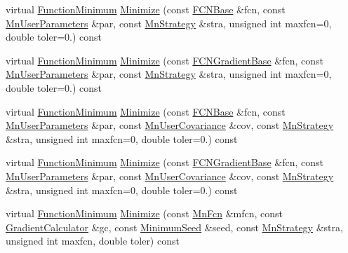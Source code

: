 \begin{DoxyCompactItemize}
\item 
virtual \mbox{\hyperlink{classROOT_1_1Minuit2_1_1FunctionMinimum}{Function\+Minimum}} \mbox{\hyperlink{classROOT_1_1Minuit2_1_1FumiliMinimizer_a22c4059fb94d5e40c843ac90440d2975}{Minimize}} (const \mbox{\hyperlink{classROOT_1_1Minuit2_1_1FCNBase}{F\+C\+N\+Base}} \&fcn, const \mbox{\hyperlink{classROOT_1_1Minuit2_1_1MnUserParameters}{Mn\+User\+Parameters}} \&par, const \mbox{\hyperlink{classROOT_1_1Minuit2_1_1MnStrategy}{Mn\+Strategy}} \&stra, unsigned int maxfcn=0, double toler=0.) const
\item 
virtual \mbox{\hyperlink{classROOT_1_1Minuit2_1_1FunctionMinimum}{Function\+Minimum}} \mbox{\hyperlink{classROOT_1_1Minuit2_1_1FumiliMinimizer_a2b14890a2b40ae8db356b71be505ce66}{Minimize}} (const \mbox{\hyperlink{classROOT_1_1Minuit2_1_1FCNGradientBase}{F\+C\+N\+Gradient\+Base}} \&fcn, const \mbox{\hyperlink{classROOT_1_1Minuit2_1_1MnUserParameters}{Mn\+User\+Parameters}} \&par, const \mbox{\hyperlink{classROOT_1_1Minuit2_1_1MnStrategy}{Mn\+Strategy}} \&stra, unsigned int maxfcn=0, double toler=0.) const
\item 
virtual \mbox{\hyperlink{classROOT_1_1Minuit2_1_1FunctionMinimum}{Function\+Minimum}} \mbox{\hyperlink{classROOT_1_1Minuit2_1_1FumiliMinimizer_a954728eb57315bb43039fe2ba71f4098}{Minimize}} (const \mbox{\hyperlink{classROOT_1_1Minuit2_1_1FCNBase}{F\+C\+N\+Base}} \&fcn, const \mbox{\hyperlink{classROOT_1_1Minuit2_1_1MnUserParameters}{Mn\+User\+Parameters}} \&par, const \mbox{\hyperlink{classROOT_1_1Minuit2_1_1MnUserCovariance}{Mn\+User\+Covariance}} \&cov, const \mbox{\hyperlink{classROOT_1_1Minuit2_1_1MnStrategy}{Mn\+Strategy}} \&stra, unsigned int maxfcn=0, double toler=0.) const
\item 
virtual \mbox{\hyperlink{classROOT_1_1Minuit2_1_1FunctionMinimum}{Function\+Minimum}} \mbox{\hyperlink{classROOT_1_1Minuit2_1_1FumiliMinimizer_adb2739d40e10cce1923e5a21dac3f420}{Minimize}} (const \mbox{\hyperlink{classROOT_1_1Minuit2_1_1FCNGradientBase}{F\+C\+N\+Gradient\+Base}} \&fcn, const \mbox{\hyperlink{classROOT_1_1Minuit2_1_1MnUserParameters}{Mn\+User\+Parameters}} \&par, const \mbox{\hyperlink{classROOT_1_1Minuit2_1_1MnUserCovariance}{Mn\+User\+Covariance}} \&cov, const \mbox{\hyperlink{classROOT_1_1Minuit2_1_1MnStrategy}{Mn\+Strategy}} \&stra, unsigned int maxfcn=0, double toler=0.) const
\item 
virtual \mbox{\hyperlink{classROOT_1_1Minuit2_1_1FunctionMinimum}{Function\+Minimum}} \mbox{\hyperlink{classROOT_1_1Minuit2_1_1FumiliMinimizer_ace396e586a17ad934f18b32c8ddd054a}{Minimize}} (const \mbox{\hyperlink{classROOT_1_1Minuit2_1_1MnFcn}{Mn\+Fcn}} \&mfcn, const \mbox{\hyperlink{classROOT_1_1Minuit2_1_1GradientCalculator}{Gradient\+Calculator}} \&gc, const \mbox{\hyperlink{classROOT_1_1Minuit2_1_1MinimumSeed}{Minimum\+Seed}} \&seed, const \mbox{\hyperlink{classROOT_1_1Minuit2_1_1MnStrategy}{Mn\+Strategy}} \&stra, unsigned int maxfcn, double toler) const
\end{DoxyCompactItemize}


